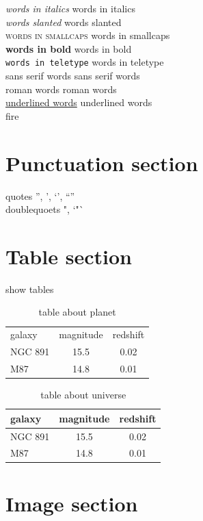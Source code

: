 \documentclass{article}
\begin{document}
\noindent
\textit{words in italics} words in italics\\
\textsl{words slanted} words slanted\\
\textsc{words in smallcaps} words in smallcaps\\
\textbf{words in bold} words in bold\\
\texttt{words in teletype} words in teletype\\
\textsf{sans serif words} sans serif words\\
\textrm{roman words} roman words\\
\underline{underlined words} underlined words\\

\noindent
{\color{red}fire}

{\section{Punctuation section}}
quotes '', ', `', ``''\\
doublequoets ", `"`


{\section{Table section}}
show tables
\begin{table}[h]
  \centering
  \begin{tabular}{lcc}
    galaxy & magnitude & redshift \\
    NGC 891 & 15.5 & 0.02 \\
    M87 & 14.8 & 0.01		
  \end{tabular}
  \caption{table about planet}
  \label{tab-withoud-line}	
\end{table}


\begin{table}[h]
  \centering
  \begin{tabular}{|l|c|c|}
    galaxy & magnitude & redshift \\
    \hline
    NGC 891 & 15.5 & 0.02 \\
    \cline{2-3}
    M87 & 14.8 & 0.01		
  \end{tabular}
  \caption{table about universe}
  \label{tab-with-line}	
\end{table}




{\section{Image section}}
\end{document}
